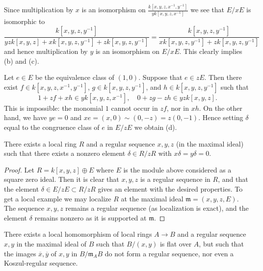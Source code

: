 \medskip\noindent
Since multiplication by $x$ is an isomorphism on
$\frac{k[x, y, z, x^{-1}, y^{-1}]}{yk[x, y, z, x^{-1}]}$ we see that
$E/xE$ is isomorphic to
$$
\frac{k[x, y, z, y^{-1}]}{
yzk[x, y, z] + xk[x, y, z, y^{-1}] + zk[x, y, z, y^{-1}]}
=
\frac{k[x, y, z, y^{-1}]}{xk[x, y, z, y^{-1}] + zk[x, y, z, y^{-1}]}
$$
and hence multiplication by $y$ is an isomorphism on $E/xE$. This clearly
implies (b) and (c).

\medskip\noindent
Let $e \in E$ be the equivalence class of $(1, 0)$.
Suppose that $e \in zE$. Then there exist $f \in k[x, y, z, x^{-1}, y^{-1}]$,
$g \in k[x, y, z, y^{-1}]$, and $h \in k[x, y, z, y^{-1}]$ such that
$$
1 + zf + xh \in yk[x, y, z, x^{-1}], \quad
0 + zg - zh \in yzk[x, y, z].
$$
This is impossible: the monomial $1$ cannot occur in
$zf$, nor in $xh$. On the other hand, we have $ye = 0$ and
$xe = (x, 0) \sim (0, -z) = z(0, -1)$. Hence setting $\delta$
equal to the congruence class of $e$ in $E/zE$ we obtain (d).

\begin{lemma}
\label{lemma-strange-regular-sequence}
There exists a local ring $R$ and a regular sequence $x, y, z$
(in the maximal ideal) such that there exists a nonzero element
$\delta \in R/zR$ with $x\delta = y\delta = 0$.
\end{lemma}

\begin{proof}
Let $R = k[x, y, z] \oplus E$ where $E$ is the module above considered
as a square zero ideal. Then it is clear that $x, y, z$ is a regular
sequence in $R$, and that the element $\delta \in E/zE \subset R/zR$
gives an element with the desired properties. To get a local example
we may localize $R$ at the maximal ideal $\mathfrak m = (x, y, z, E)$.
The sequence $x, y, z$ remains a regular sequence (as localization is
exact), and the element $\delta$ remains nonzero as it is supported
at $\mathfrak m$.
\end{proof}

\begin{lemma}
\label{lemma-base-change-regular-sequence}
There exists a local homomorphism of local rings $A \to B$
and a regular sequence $x, y$ in the maximal ideal of $B$ such that
$B/(x, y)$ is flat over $A$, but such that the images
$\overline{x}, \overline{y}$ of $x, y$ in $B/\mathfrak m_AB$ do not
form a regular sequence, nor even a Koszul-regular sequence.
\end{lemma}

